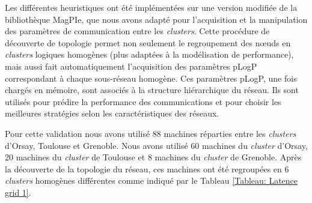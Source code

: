 Les différentes heuristiques ont été implémentées sur une version modifiée
de la bibliothèque MagPIe\cite{Kielmann99b}, que nous avons adapté pour l'acquisition
et la manipulation des paramètres de communication entre les  \textit{clusters}. Cette procédure de
découverte de topologie permet non seulement le regroupement des n{\oe}uds
en \textit{clusters} logiques homogènes (plus adaptées à la modélisation de
performance), mais aussi fait automatiquement l'acquisition des paramètres
pLogP correspondant à chaque sous-réseau homogène. Ces paramètres
pLogP, une fois chargés en mémoire, sont associés à la structure hiérarchique
du réseau. Ils sont utilisés pour prédire la performance des communications et pour choisir les meilleures
stratégies selon les caractéristiques des réseaux.

Pour cette validation nous avons utilisé 88 machines réparties entre les \textit{clusters}
d'Orsay, Toulouse et Grenoble. Nous avons utilisé 60 machines
du  \textit{cluster} d'Orsay, 20 machines du  \textit{cluster} de Toulouse et
8 machines du  \textit{cluster} de Grenoble. Après la découverte de la topologie du réseau, ces machines ont été regroupées en 6
\textit{clusters} homogènes différentes comme indiqué par le Tableau \ref{Tableau: Latence grid 1}. 

